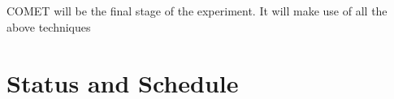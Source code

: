 \section{\COMET \phaseII}
COMET \phaseII will be the final stage of the experiment.
It will make use of all the above techniques

\FigPhaseII

\section{\COMET \phaseI}
\FigPhaseI

\section{Status and Schedule}
